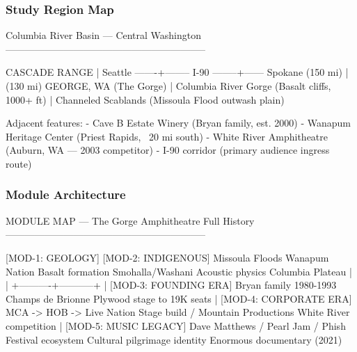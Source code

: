 \documentclass[11pt,letterpaper]{article}
\begin{document}
\subsubsection{Study Region Map}

\begin{asciibox}
Columbia River Basin --- Central Washington
--------------------------------------------------------------

              CASCADE RANGE
                   |
    Seattle -------+-------- I-90 --------+------ Spokane
    (150 mi)                              |       (130 mi)
                                     GEORGE, WA
                                     (The Gorge)
                                          |
                               Columbia River Gorge
                              (Basalt cliffs, 1000+ ft)
                                          |
                              Channeled Scablands
                          (Missoula Flood outwash plain)

Adjacent features:
  - Cave B Estate Winery (Bryan family, est. 2000)
  - Wanapum Heritage Center (Priest Rapids, ~20 mi south)
  - White River Amphitheatre (Auburn, WA --- 2003 competitor)
  - I-90 corridor (primary audience ingress route)
\end{asciibox}

\subsubsection{Module Architecture}

\begin{asciibox}
MODULE MAP --- The Gorge Amphitheatre Full History
--------------------------------------------------------------

  [MOD-1: GEOLOGY]     [MOD-2: INDIGENOUS]
  Missoula Floods       Wanapum Nation
  Basalt formation      Smohalla/Washani
  Acoustic physics      Columbia Plateau
       |                      |
       +----------+-----------+
                  |
          [MOD-3: FOUNDING ERA]
          Bryan family 1980-1993
          Champs de Brionne
          Plywood stage to 19K seats
                  |
          [MOD-4: CORPORATE ERA]
          MCA -> HOB -> Live Nation
          Stage build / Mountain Productions
          White River competition
                  |
          [MOD-5: MUSIC LEGACY]
          Dave Matthews / Pearl Jam / Phish
          Festival ecosystem
          Cultural pilgrimage identity
          Enormous documentary (2021)
\end{asciibox}
\end{document}
